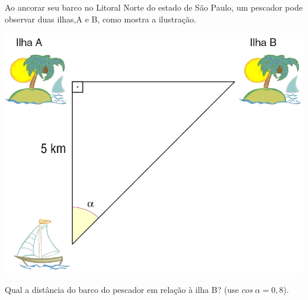 \item Ao ancorar seu barco no Litoral Norte do estado de São Paulo, um pescador pode observar duas ilhas,A e B, como mostra a ilustração.
\begin{center}
\includegraphics[scale=0.3]{figuras/fig93.png}
\end{center}
Qual a distância do barco do pescador em relação à ilha B? (use $cos\ \alpha = 0,8$).

